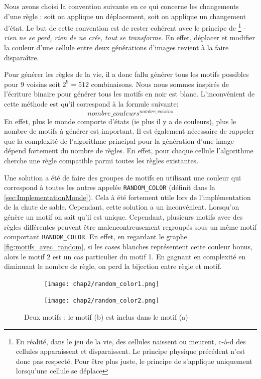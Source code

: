 Nous avons choisi la convention suivante en ce qui concerne les changements d'une règle : soit on applique un déplacement, soit on applique un changement d'état. Le but de cette convention est de rester cohérent avec le principe de  \footnote{En réalité, dans le jeu de la vie, des cellules naissent ou meurent, c-à-d des cellules apparaissent et disparaissent. Le principe physique précédent n'est donc pas respecté. Pour être plus juste, le principe de  s'applique uniquement lorsqu'une cellule se déplace} - \emph{rien ne se perd, rien de ne crée, tout se transforme}. En effet, déplacer et modifier la couleur d'une cellule entre deux générations d'images revient à la faire disparaître.

Pour générer les règles de la vie, il a donc fallu générer tous les motifs possibles pour 9 voisins soit $2^9 = 512$ combinaisons. Nous nous sommes inspirés de l'écriture binaire pour générer tous les motifs en noir est blanc. L'inconvénient de cette méthode est qu'il correspond à la formule suivante: $$nombre\_couleurs^{nombre\_voisins} $$
En effet, plus le monde comporte d'états (ie plus il y a de couleurs), plus le nombre de motifs à générer est important. Il est également nécessaire de rappeler que la complexité de l'algorithme principal pour la génération d'une image dépend fortement du nombre de règles. En effet, pour chaque cellule l'algorithme cherche une règle compatible parmi toutes les règles existantes.

Une solution a été de faire des groupes de motifs en utilisant une couleur qui correspond à toutes les autres appelée \texttt{RANDOM\_COLOR} (définit dans la \autoref{sec:ImplementationMonde}). Cela à été fortement utile lors de l'implémentation de la chute de sable. Cependant, cette solution a un inconvénient. Lorsqu'on génère un motif on sait qu'il est unique. Cependant, plusieurs motifs avec des règles différentes peuvent être malencontreusement regroupés sous un même motif comportant \texttt{RANDOM\_COLOR}. En effet, en regardant le graphe \autoref{fig:motifs_avec_random}, si les cases blanches représentent cette couleur bonus, alors le motif 2 est un cas particulier du motif 1. En gagnant en complexité en diminuant le nombre de règle, on perd la bijection entre règle et motif.

\begin{figure}[ht]
    \centering
    \hspace*{\fill}
    \begin{subfigure}{0.3\textwidth}
        \centering
        \texttt{[image: chap2/random\_color1.png]}
        \label{fig:motif2}
    \end{subfigure}
    \hfill
    \begin{subfigure}{0.3\textwidth}
        \centering
        \texttt{[image: chap2/random\_color2.png]}
        \label{fig:motif1}
    \end{subfigure}
    \hspace*{\fill}
    \caption{Deux motifs : le motif (b) est inclus dans le motif (a)}
    \label{fig:motifs_avec_random}
\end{figure}

